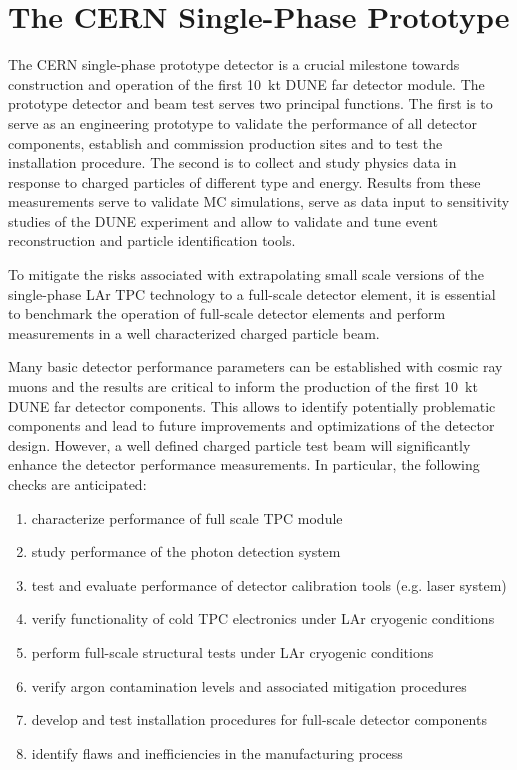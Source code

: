 \section{The CERN Single-Phase Prototype} 
\label{sec:proto-cern-single}


The CERN single-phase prototype detector is a crucial milestone
towards construction and operation of the first 10~kt DUNE far
detector module. The prototype detector and beam test serves two
principal functions.  The first is to serve as an engineering
prototype to validate the performance of all detector components,
establish and commission production sites and to test the installation
procedure.  The second is to collect and study physics data in
response to charged particles of different type and energy.  Results
from these measurements serve to validate MC simulations, serve as
data input to sensitivity studies of the DUNE experiment and allow to
validate and tune event reconstruction and particle identification
tools.

To mitigate the risks associated with extrapolating small scale
versions of the single-phase LAr TPC technology to a full-scale
detector element, it is essential to benchmark the operation of
full-scale detector elements and perform measurements in a well
characterized charged particle beam.


Many basic detector performance parameters can be established with
cosmic ray muons and the results are critical to inform the production
of the first 10~kt DUNE far detector components. This allows to
identify potentially problematic components and lead to future
improvements and optimizations of the detector design. However, a
well defined charged particle test beam will significantly enhance the
detector performance measurements.  In particular, the following
checks are anticipated:
\begin{enumerate}
 \item characterize performance of full scale TPC module
 \item study performance of the photon detection system
 \item test and evaluate performance of detector calibration tools (e.g. laser system)
  \item verify functionality of cold TPC electronics under LAr cryogenic conditions
  \item perform full-scale structural tests under LAr cryogenic conditions
  \item verify argon contamination levels and associated mitigation procedures
  \item develop and test installation procedures for full-scale detector components
  \item identify flaws and inefficiencies in the manufacturing process
\end{enumerate}


